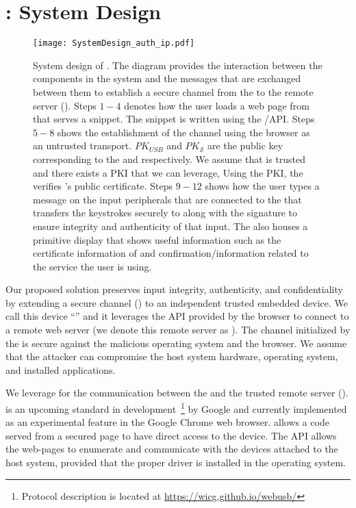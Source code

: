 \section{\toolname: System Design}
\label{sec:systemDesign}

\begin{figure*}[t]
 \centering
 \texttt{[image: SystemDesign\_auth\_ip.pdf]}
 \caption{System design of \tool. The diagram provides the interaction between the components in the system and the messages that are exchanged between them to establish a secure channel from the \device to the remote server (\server). Steps $1-4$ denotes how the user loads a web page from \server that serves a \js snippet. The \js snippet is written using the \webusb/\webbt API. Steps $5-8$ shows the establishment of the \tls channel using the browser as an untrusted transport. $PK_{USB}$ and $PK_{\mathcal{S}}$ are the public key corresponding to the \device and \server respectively. We assume that \server is trusted and there exists a PKI that we can leverage, Using the PKI, the \device verifies \server's public certificate. Steps $9-12$ shows how the user types a message on the input peripherals that are connected to the \device that transfers the keystrokes securely to \server along with the signature to ensure integrity and authenticity of that input. The \device also houses a primitive display that shows useful information such as the certificate information of \server and confirmation/information related to the service the user is using.}
 \label{fig:systemDesignAuthInput}
\end{figure*}

Our proposed solution preserves input integrity, authenticity, and confidentiality by extending a secure channel (\tls) to an independent trusted embedded device. We call this device ``\device'' and it leverages the \webusb API provided by the browser to connect to a remote web server (we denote this remote server as \server). The \tls channel initialized by the \device is secure against the malicious operating system and the browser. We assume that the attacker can compromise the host system hardware, operating system, and installed applications. 

 We leverage \webusb for the communication between the \device and the trusted remote server (\server). \webusb is an upcoming standard in development~\footnote{Protocol description is located at \url{https://wicg.github.io/webusb/}} by Google and currently implemented as an experimental feature in the Google Chrome web browser. \webusb allows a \js code served from a \https secured page to have direct access to the \usb device. The \webusb API allows the web-pages to enumerate and communicate with the \usb devices attached to the host system, provided that the proper \usb driver is installed in the operating system.


